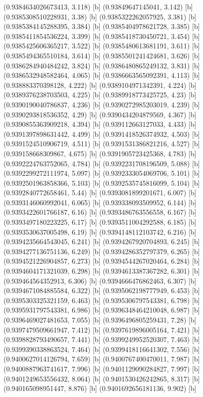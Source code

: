 {{{(0.9384634026673413, 3.118) [b] 
(0.93849647145041, 3.142) [b] 
(0.9385308510228931, 3.38) [b] 
(0.9385322262057925, 3.381) [b] 
(0.9385384145288395, 3.384) [b] 
(0.9385404978621728, 3.385) [b] 
(0.9385411854536224, 3.399) [b] 
(0.9385418730450721, 3.454) [b] 
(0.9385425606365217, 3.522) [b] 
(0.9385480613681191, 3.611) [b] 
(0.9385494365510184, 3.614) [b] 
(0.9385501241424681, 3.626) [b] 
(0.9386284940484242, 3.824) [b] 
(0.9386480865249132, 3.831) [b] 
(0.9386532948582464, 4.065) [b] 
(0.9386663565092391, 4.113) [b] 
(0.938883370398128, 4.222) [b] 
(0.9389104971342391, 4.224) [b] 
(0.9389376238703503, 4.225) [b] 
(0.9389918773425725, 4.23) [b] 
(0.9390190040786837, 4.236) [b] 
(0.9390272985203019, 4.239) [b] 
(0.9390293818536352, 4.29) [b] 
(0.9390434204879569, 4.367) [b] 
(0.9390855363909218, 4.394) [b] 
(0.939112663127033, 4.433) [b] 
(0.9391397898631442, 4.499) [b] 
(0.9391418526374932, 4.503) [b] 
(0.9391524510906719, 4.511) [b] 
(0.9391531386821216, 4.527) [b] 
(0.939158668309867, 4.675) [b] 
(0.9391905723425368, 4.783) [b] 
(0.9392224763752065, 4.784) [b] 
(0.9392231708196509, 5.088) [b] 
(0.9392299272111974, 5.097) [b] 
(0.9392333054069706, 5.101) [b] 
(0.9392501963858366, 5.103) [b] 
(0.9392535745816099, 5.104) [b] 
(0.9392840772658461, 5.44) [b] 
(0.9393081899201671, 6.007) [b] 
(0.9393146060992041, 6.065) [b] 
(0.939338093509952, 6.144) [b] 
(0.9393422601766187, 6.16) [b] 
(0.9393486763556558, 6.167) [b] 
(0.9393497180223225, 6.17) [b] 
(0.9393511004292588, 6.185) [b] 
(0.9393530637005498, 6.19) [b] 
(0.9394148112103742, 6.216) [b] 
(0.9394235664543045, 6.241) [b] 
(0.9394267920704893, 6.245) [b] 
(0.9394277136751136, 6.249) [b] 
(0.9394286352797379, 6.265) [b] 
(0.9394521226904857, 6.273) [b] 
(0.9394544267020464, 6.284) [b] 
(0.9394604171321039, 6.298) [b] 
(0.9394613387367282, 6.301) [b] 
(0.939464564352913, 6.306) [b] 
(0.9394666476862463, 6.307) [b] 
(0.9394671084885584, 6.322) [b] 
(0.9395062198777949, 6.453) [b] 
(0.9395303325321159, 6.463) [b] 
(0.9395306797543381, 6.798) [b] 
(0.9395931797543381, 6.986) [b] 
(0.9396348464210048, 6.987) [b] 
(0.9396469027481653, 7.055) [b] 
(0.9396496805259431, 7.28) [b] 
(0.9397479509661947, 7.412) [b] 
(0.9397619896005164, 7.421) [b] 
(0.9398828793490657, 7.441) [b] 
(0.9399249952520307, 7.463) [b] 
(0.9399390338863524, 7.464) [b] 
(0.9399418116641302, 7.556) [b] 
(0.9400627014126794, 7.659) [b] 
(0.9400767400470011, 7.987) [b] 
(0.9400887963741617, 7.996) [b] 
(0.9401129090284827, 7.997) [b] 
(0.9401249653556432, 8.064) [b] 
(0.9401530426242865, 8.317) [b] 
(0.940165098951447, 8.876) [b] 
(0.9401692656181136, 9.902) [b] 
}}}
